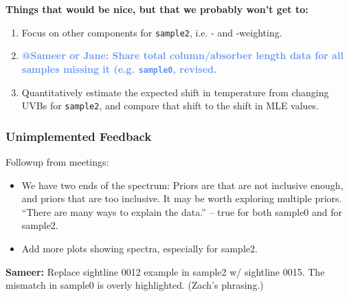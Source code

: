 \documentclass[fleqn,usenatbib]{mnras}
\makeatletter
\newcommand{\atsameer}[1]{\textcolor{CornflowerBlue}{\textbf{@Sameer or Jane: #1}}}
\makeatother
\begin{document}
\textbf{Things that would be nice, but that we probably won't get to:}
\begin{enumerate}
    \item Focus on other components for \texttt{sample2}, i.e. - and -weighting.
    \item \atsameer{Share total column/absorber length data for all samples missing it (e.g. \texttt{sample0}, revised.}
    \item Quantitatively estimate the expected shift in temperature from changing UVBs for \texttt{sample2}, and compare that shift to the shift in MLE values.
\end{enumerate}

\subsubsection{Unimplemented Feedback}

Followup from meetings:
\begin{itemize}
    \item We have two ends of the spectrum:
Priors are that are not inclusive enough, and priors that are too inclusive.
It may be worth exploring multiple priors.
``There are many ways to explain the data.'' -- true for both sample0 and for sample2.
    \item Add more plots showing spectra, especially for sample2.
\end{itemize}

\textbf{Sameer:}
Replace sightline 0012 example in sample2 w/ sightline 0015.
The mismatch in sample0 is overly highlighted. (Zach's phrasing.)
\end{document}
